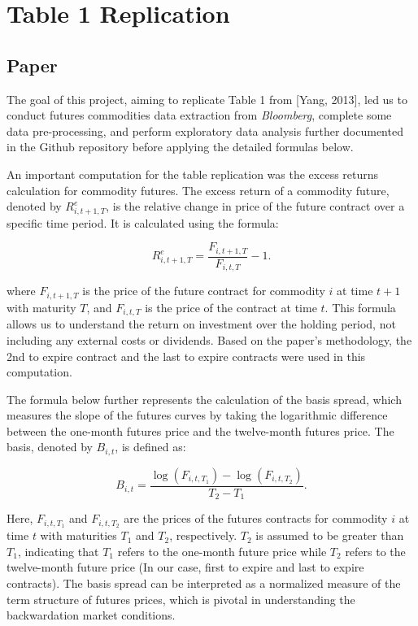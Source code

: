 \documentclass{article}
\begin{document}
\section{Table 1 Replication}
\subsection{Paper}

The goal of this project, aiming to replicate Table 1 from [Yang, 2013], led us to conduct futures commodities data extraction from \textit{Bloomberg}, complete some data pre-processing, and perform exploratory data analysis further documented in the Github repository before applying the detailed formulas below.

An important computation for the table replication was the excess returns calculation for commodity futures. The excess return of a commodity future, denoted by \( R^e_{i,t+1,T} \), is the relative change in price of the future contract over a specific time period. It is calculated using the formula:

\[
R^e_{i,t+1,T} = \frac{F_{i,t+1,T}}{F_{i,t,T}} - 1.
\]

where \( F_{i,t+1,T} \) is the price of the future contract for commodity \( i \) at time \( t+1 \) with maturity \( T \), and \( F_{i,t,T} \) is the price of the contract at time \( t \). This formula allows us to understand the return on investment over the holding period, not including any external costs or dividends. Based on the paper's methodology, the 2nd to expire contract and the last to expire contracts were used in this computation. 

The formula below further represents the calculation of the basis spread, which measures the slope of the futures curves by taking the logarithmic difference between the one-month futures price and the twelve-month futures price. The basis, denoted by \( B_{i,t} \), is defined as:

\[
B_{i,t} = \frac{\log(F_{i,t,T_1}) - \log(F_{i,t,T_2})}{T_2 - T_1}.
\]

Here, \( F_{i,t,T_1} \) and \( F_{i,t,T_2} \) are the prices of the futures contracts for commodity \( i \) at time \( t \) with maturities \( T_1 \) and \( T_2 \), respectively. \( T_2 \) is assumed to be greater than \( T_1 \), indicating that \( T_1 \) refers to the one-month future price while \( T_2 \) refers to the twelve-month future price (In our case, first to expire and last to expire contracts). The basis spread can be interpreted as a normalized measure of the term structure of futures prices, which is pivotal in understanding the backwardation market conditions.
\end{document}
